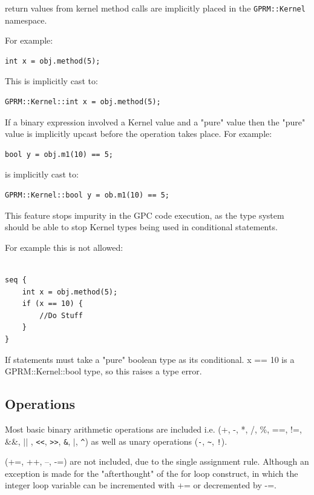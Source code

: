         return values from kernel method calls are implicitly placed
        in the \texttt{GPRM::Kernel} namespace. 

For example:

\begin{lstlisting}[style=myGPC]
int x = obj.method(5);
\end{lstlisting}

This is implicitly cast to:

\begin{lstlisting}[style=myGPC]
GPRM::Kernel::int x = obj.method(5);
\end{lstlisting}     

If a binary expression involved a Kernel value and a "pure" value
then the "pure" value is implicitly upcast before the operation takes
place. For example:

\begin{lstlisting}[style=myGPC]
bool y = obj.m1(10) == 5;    
\end{lstlisting}

is implicitly cast to:

\begin{lstlisting}[style=myGPC]
GPRM::Kernel::bool y = ob.m1(10) == 5;
\end{lstlisting}

This feature stops impurity in the GPC code execution, as the type system
should be able to stop Kernel types being used in conditional
statements. 

For example this is not allowed:
\begin{lstlisting}[style=myGPC]

seq {
    int x = obj.method(5);
    if (x == 10) {
        //Do Stuff
    }    
}

\end{lstlisting}

If statements must take a "pure" boolean type as its conditional.
x == 10 is a GPRM::Kernel::bool type, so this raises a type error.
  
\subsection{Operations}
        Most basic binary arithmetic operations are included i.e. 
        (+, -, *, /, \%, ==, !=, \&\&, $||$ , \lstinline|<<|, \lstinline|>>|, \lstinline|&|, $|$, 
        \lstinline|^|) as well as
        unary operations 
        (\lstinline|-|, \lstinline|~|, \lstinline|!|).

        (+=, ++, --, -=) are not included, due to the single assignment rule.
        Although an exception is made for the "afterthought" of the for loop construct, in which
        the integer loop variable can be incremented with += or decremented by -=.

